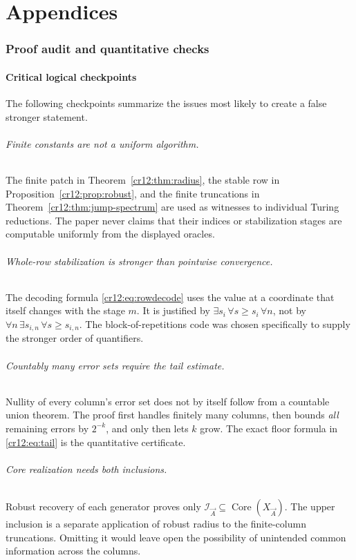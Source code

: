 \documentclass[11pt,letterpaper]{article}
\theoremstyle{plain}
\theoremstyle{definition}
\theoremstyle{remark}
\numberwithin{equation}{section}
\newcommand{\Core}{\operatorname{Core}}
\newcommand{\I}{\mathcal I}
\begin{document}
\appendix
\part*{Appendices}
\section{Proof audit and quantitative checks}\label{cr12:app:audit}
\subsection{Critical logical checkpoints}
The following checkpoints summarize the issues most likely to create a false
stronger statement.

\paragraph{Finite constants are not a uniform algorithm.}
The finite patch in Theorem~\ref{cr12:thm:radius}, the stable row in
Proposition~\ref{cr12:prop:robust}, and the finite truncations in
Theorem~\ref{cr12:thm:jump-spectrum} are used as witnesses to individual Turing
reductions. The paper never claims that their indices or stabilization stages
are computable uniformly from the displayed oracles.

\paragraph{Whole-row stabilization is stronger than pointwise convergence.}
The decoding formula \eqref{cr12:eq:rowdecode} uses the value at a coordinate that
itself changes with the stage $m$. It is justified by
$\exists s_i\,\forall s\ge s_i\,\forall n$, not by
$\forall n\,\exists s_{i,n}\,\forall s\ge s_{i,n}$.
The block-of-repetitions code was chosen specifically to supply the stronger
order of quantifiers.

\paragraph{Countably many error sets require the tail estimate.}
Nullity of every column's error set does not by itself follow from a countable
union theorem. The proof first handles finitely many columns, then bounds
\emph{all} remaining errors by $2^{-k}$, and only then lets $k$ grow.
The exact floor formula in \eqref{cr12:eq:tail} is the quantitative certificate.

\paragraph{Core realization needs both inclusions.}
Robust recovery of each generator proves only
$\I_{\vec A}\subseteq\Core(X_{\vec A})$. The upper inclusion is a separate
application of robust radius to the finite-column truncations. Omitting it
would leave open the possibility of unintended common information across the
columns.
\end{document}
